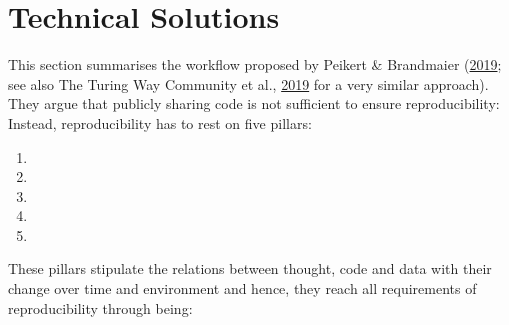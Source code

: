 \documentclass[12pt,a4paper,twoside]{article}
\providecommand{\tightlist}{%
  \setlength{\itemsep}{0pt}\setlength{\parskip}{0pt}}
\begin{document}
\hypertarget{technical-solutions}{%
\section{Technical Solutions}\label{technical-solutions}}

This section summarises the workflow proposed by Peikert \& Brandmaier (\protect\hyperlink{ref-peikertReproducibleDataAnalysis2019}{2019}; see also The Turing Way Community et al., \protect\hyperlink{ref-theturingwaycommunityTuringWayHandbook2019}{2019} for a very similar approach).
They argue that publicly sharing code is not sufficient to ensure reproducibility:
Instead, reproducibility has to rest on five pillars:

\begin{enumerate}
\def\labelenumi{\arabic{enumi}.}
\item
\item
\item
\item
\item
\end{enumerate}

These pillars stipulate the relations between thought, code and data with their change over time and environment and hence, they reach all requirements of reproducibility through being:
\end{document}

